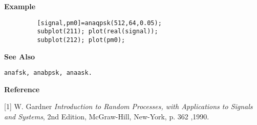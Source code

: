 {\bf \large \sf Example}
\begin{verbatim}
         [signal,pm0]=anaqpsk(512,64,0.05); 
         subplot(211); plot(real(signal)); 
         subplot(212); plot(pm0);
\end{verbatim}
\vspace*{.5cm}


{\bf \large \sf See Also}\\
\hspace*{1.5cm}
\begin{minipage}[t]{13.5cm}
\begin{verbatim}
anafsk, anabpsk, anaask.
\end{verbatim}
\end{minipage}
 \vspace*{.5cm}


{\bf \large \sf Reference}\\
\hspace*{1.5cm}
\begin{minipage}[t]{13.5cm}
[1] W. Gardner {\it Introduction to Random Processes, with Applications to
Signals and Systems}, 2nd Edition, McGraw-Hill, New-York, p. 362 ,1990.  
\end{minipage}

